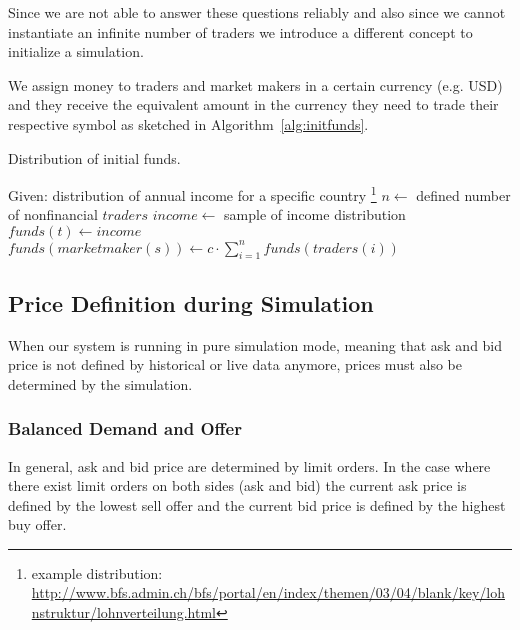 Since we are not able to answer these questions reliably and also since we cannot
instantiate an infinite number of traders we introduce a different concept to
initialize a simulation.

We assign money to traders and market makers in a certain currency (e.g. USD) and 
they receive the equivalent amount in the currency they need to trade their respective
symbol as sketched in Algorithm~\ref{alg:initfunds}.

\begin{algorithm}
\caption{Distribution of initial funds.}
\label{alg:initfunds}
\begin{algorithmic}[1]
    \Statex Given: distribution of annual income for a specific country
    \footnote{example distribution: \url{http://www.bfs.admin.ch/bfs/portal/en/index/themen/03/04/blank/key/lohnstruktur/lohnverteilung.html}}
    \Statex
        \State  $n \gets$ defined number of nonfinancial $traders$
            \State $income \gets$ sample of income distribution
            \State $funds(t) \gets income$
        \EndFor
        \State $funds(marketmaker(s)) \gets c \cdot \sum_{i=1}^n funds(traders(i))$
    \EndFor
\end{algorithmic}
\end{algorithm}

%
%
%

\subsection{Price Definition during Simulation}

When our system is running in pure simulation mode, meaning that ask and bid price is
not defined by historical or live data anymore, prices must also be determined by the
simulation. 

\subsubsection{Balanced Demand and Offer}
In general, ask and bid price are determined by limit orders. In the case where there
exist limit orders on both sides (ask and bid) the current ask price is defined by the
lowest sell offer and the current bid price is defined by the highest buy offer.

